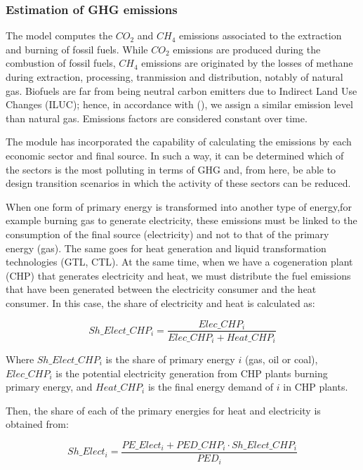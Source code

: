 \subsubsection{Estimation of GHG emissions}

The model computes the $CO_2$ and $CH_4$ emissions associated to the extraction and burning of fossil fuels. While $CO_2$ emissions are produced during the combustion of fossil fuels, $CH_4$ emissions are originated by the losses of methane during extraction, processing, tranmission and distribution, notably of natural gas. Biofuels are far from being neutral carbon emitters due to Indirect Land Use Changes (ILUC); hence, in accordance with (), we assign a similar emission level than natural gas. Emissions factors are considered constant over time. 

The module has incorporated the capability of calculating the emissions by each economic sector and final source. In such a way, it can be determined which of the sectors is the most polluting in terms of GHG and, from here, be able to design transition scenarios in which the activity of these sectors can be reduced. 

When one form of primary energy is transformed into another type of energy,for example burning gas to generate electricity, these emissions must be linked to the consumption of the final source (electricity) and not to that of the primary energy (gas). The same goes for heat generation and liquid transformation technologies (GTL, CTL). At the same time, when we have a cogeneration plant (CHP) that generates electricity and heat, we must distribute the fuel emissions that have been generated between the electricity consumer and the heat consumer. In this case, the share of electricity and heat is calculated as:

\begin{equation}
    Sh\_Elect\_CHP_i= \frac{Elec\_CHP_i}{Elec\_CHP_i+Heat\_CHP_i}
    \label{eq:share-elec-CHP}
\end{equation}


Where $Sh\_Elect\_CHP_i$ is the share of primary energy $i$ (gas, oil or coal), $Elec\_CHP_i$ is the potential electricity generation from CHP plants burning primary energy, and $Heat\_CHP_i$ is the final energy demand of $i$ in CHP plants. 

Then, the share of each of the primary energies for heat and electricity is obtained from:

\begin{equation}
    Sh\_Elect_i= \frac{PE\_Elect_i+PED\_CHP_i \cdot Sh\_Elect\_CHP_i}{PED_i}
    \label{eq:share-elect-i}
\end{equation}



\paragraph{}